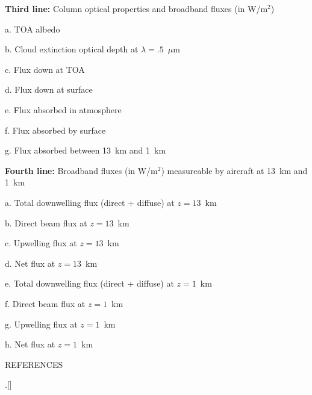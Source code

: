 {\bf Third line:} Column optical properties and broadband fluxes
(in W/m$^2$)  
\item{a.} TOA albedo
\item{b.} Cloud extinction optical depth at $\lambda = .5$~$\mu$m
\item{c.} Flux down at TOA
\item{d.} Flux down at surface
\item{e.} Flux absorbed in atmosphere
\item{f.} Flux absorbed by surface
\item{g.} Flux absorbed between 13~km and 1~km

{\bf Fourth line:} Broadband fluxes (in W/m$^2$) measureable by
aircraft at 13~km and 1~km
\item{a.} Total downwelling flux (direct + diffuse) at $z = 13$~km
\item{b.} Direct beam flux at $z = 13$~km
\item{c.} Upwelling flux at $z = 13$~km
\item{d.} Net flux at $z = 13$~km
\item{e.} Total downwelling flux (direct + diffuse) at $z = 1$~km
\item{f.} Direct beam flux at $z = 1$~km
\item{g.} Upwelling flux at $z = 1$~km
\item{h.} Net flux at $z = 1$~km
%
\vfill\eject

\centerline{REFERENCES}
\bigskip
.[]
\vfill\eject

